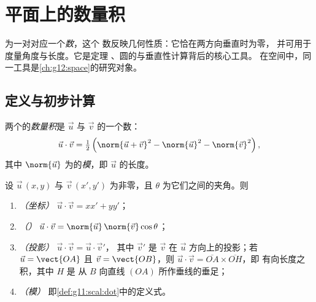 \chapter{平面上的数量积}\label{ch:g11:scal}

为一对对应一个\emph{数}，这个
数反映几何性质：它恰在两方向垂直时为零，
并可用于度量角度与长度。它是定理
、圆的与垂直性计算背后的核心工具。
在空间中，同一工具是\cref{ch:g12:space}的研究对象。

\section{定义与初步计算}

\begin{definition}[数量积]\label{def:g11:scal:dot}
两个的\emph{数量积}是
$\vec u$ 与 $\vec v$ 的一个数：
\[
\vec u \cdot \vec v
= \tfrac12\left(\norm{\vec u + \vec v}^2 - \norm{\vec u}^2
- \norm{\vec v}^2\right),
\]
其中 $\norm{\vec u}$ 为的\emph{模}，即 $\vec u$ 的长度。
\end{definition}

\begin{theorem}[数量积的四种表示]\label{thm:g11:scal:faces}
设 $\vec u\,(x, y)$ 与 $\vec v\,(x', y')$ 为非零，且
$\theta$ 为它们之间的夹角。则
\begin{enumerate}
  \item \emph{（坐标）} $\vec u \cdot \vec v = xx' + yy'$；
  \item \emph{（）} $\vec u \cdot \vec v =
        \norm{\vec u}\,\norm{\vec v}\cos\theta$；
  \item \emph{（投影）} $\vec u \cdot \vec v = \vec u \cdot \vec v'$，
        其中 $\vec v'$ 是 $\vec v$ 在
        $\vec u$ 方向上的投影；若 $\vec u = \vect{OA}$ 且
        $\vec v = \vect{OB}$，则
        $\vec u \cdot \vec v = \overline{OA} \times \overline{OH}$，即
        有向长度之积，其中 $H$ 是
        从 $B$ 向直线 $(OA)$ 所作垂线的垂足；
  \item \emph{（模）} 即\cref{def:g11:scal:dot}中的定义式。
\end{enumerate}
\end{theorem}

